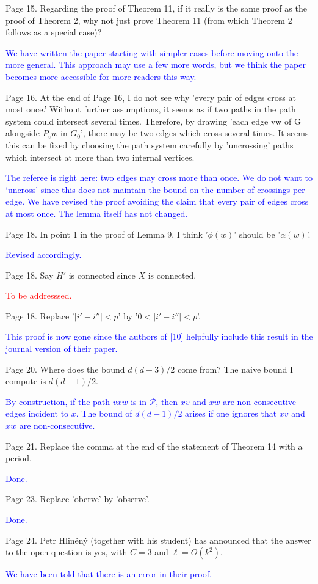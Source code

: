 \documentclass[12pt]{article}
\newcommand{\done}{\textcolor{blue}{Done.}}
\newcommand{\changed}{\textcolor{blue}{Revised accordingly.}}
\newcommand{\tba}{\textcolor{red}{To be addresssed.}}
\begin{document}
Page 15. Regarding the proof of Theorem 11, if it really is the same
proof as the proof of Theorem 2, why not just prove Theorem 11 (from
which Theorem 2 follows as a special case)?

\textcolor{blue}{We have written the paper starting with simpler cases before moving onto the more general. This approach may use a few more words, but we think the paper becomes more accessible for more readers this way.}

Page 16.  At the end of Page 16, I do not see why 'every pair of edges
cross at most once.'  Without further assumptions, it seems as if two
paths in the path system could intersect several times.  Therefore, by
drawing 'each edge vw of G alongside $P_vw$ in $G_0$', there may be two
edges which cross several times.  It seems this can be fixed by
choosing the path system carefully by 'uncrossing' paths which
intersect at more than two internal vertices.

\textcolor{blue}{The referee is right here: two edges may cross more than once. We do not want to `uncross' since this does not maintain the bound on the number of crossings per edge. We have revised the proof avoiding the claim that every pair of edges cross at most once. The lemma itself has not changed.}

Page 18. In point 1 in the proof of Lemma 9, I think '$\phi(w)$' should
be '$\alpha(w)$'.

\changed

Page 18.  Say $H'$ is connected since $X$ is connected.

\tba

Page 18.  Replace '$|i'-i''| < p$' by  '$0< |i'-i''| < p$'.

\textcolor{blue}{This proof is now gone since the authors of [10] helpfully include this result in the journal version of their paper.}

Page 20.  Where does the bound $d(d-3)/2$ come from?  The naive bound I
compute is $d(d-1)/2$.

\textcolor{blue}{By construction, if the path $vxw$ is in $\mathcal{P}$, then $xv$ and $xw$ are non-consecutive edges incident to $x$. The bound of $d(d-1)/2$ arises if one ignores that $xv$ and $xw$ are non-consecutive.}


Page 21.  Replace the comma at the end of the statement of Theorem 14
with a period.

\done

Page 23. Replace 'oberve' by 'observe'.

\done

Page 24. Petr Hliněný (together with his student) has announced that
the answer to the open question is yes, with $C=3$ and $\ell=O(k^2)$.

\textcolor{blue}{We have been told that there is an error in their proof.}
\end{document}
